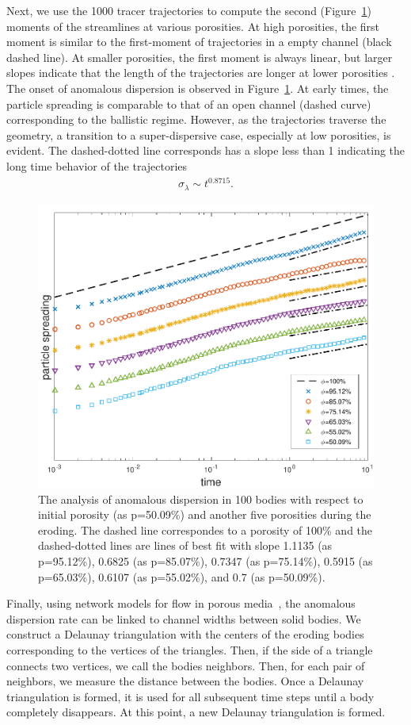 \documentclass[preprint, 10pt]{elsarticle}
\begin{document}
Next, we use the 1000 tracer trajectories to compute the second
(Figure~\ref{fig:Eroding100anomalous}) moments of the streamlines at
various porosities.  At high porosities, the first moment is similar to
the first-moment of trajectories in a empty channel (black dashed line).
At smaller porosities, the first moment is always linear, but larger
slopes indicate that the length of the trajectories are longer at lower
porosities .  The
onset of anomalous dispersion is observed in
Figure~\ref{fig:Eroding100anomalous}. At early times, the particle
spreading is comparable to that of an open channel (dashed curve)
corresponding to the ballistic regime.  However, as the trajectories
traverse the geometry, a transition to a super-dispersive case,
especially at low porosities, is evident.  The dashed-dotted line
corresponds has a slope less than 1 indicating the long time behavior of
the trajectories
\begin{align*}
  \sigma_\lambda \sim t^{0.8715}.
\end{align*}

\begin{figure}
\center
\includegraphics*[width =0.55\linewidth]{./figs/100b_second_moment_long_ref}
\caption{\label{fig:Eroding100anomalous} The analysis of anomalous
dispersion in 100 bodies with respect to initial porosity
(as p=50.09\%) and another five porosities during the eroding. The dashed line
correspondes to a porosity of 100\% and the dashed-dotted lines are lines
of best fit with slope 1.1135 (as p=95.12\%), 0.6825 (as p=85.07\%), 
0.7347 (as p=75.14\%), 0.5915 (as p=65.03\%), 
0.6107 (as p=55.02\%), and 0.7 (as p=50.09\%).}
\end{figure}

Finally, using network models for flow in porous media~\cite{}, the
anomalous dispersion rate can be linked to channel widths between solid
bodies.  We construct a Delaunay triangulation with the centers of the
eroding bodies corresponding to the vertices of the triangles.  Then, if
the side of a triangle connects two vertices, we call the bodies
neighbors.  Then, for each pair of neighbors, we measure the distance
between the bodies.  Once a Delaunay triangulation is formed, it is used
for all subsequent time steps until a body completely disappears.  At
this point, a new Delaunay triangulation is formed.  
\end{document}
